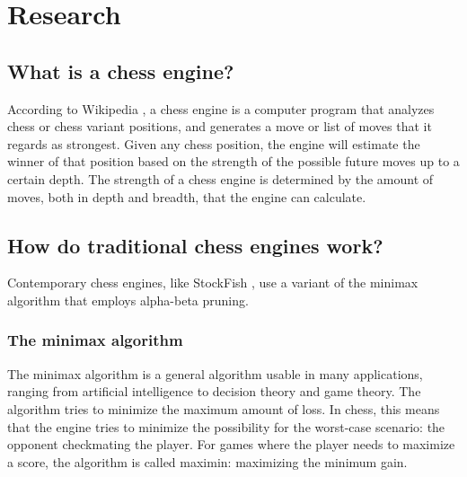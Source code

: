 \documentclass{article}
\begin{document}
\newpage
\section{Research}

% 
%
%

\subsection{What is a chess engine?}

According to Wikipedia \cite{ChessEngine2022}, a chess engine is a computer program that analyzes 
chess or chess variant positions, and generates a move or list of moves that it regards as strongest.
Given any chess position, the engine will estimate the winner of that position based on the strength 
of the possible future moves up to a certain depth. The strength of a chess engine is determined by
the amount of moves, both in depth and breadth, that the engine can calculate. 


\subsection{How do traditional chess engines work?}

Contemporary chess engines, like StockFish \cite{StockfishChess2022}, use a variant of the minimax algorithm that employs alpha-beta pruning.

\subsubsection{The minimax algorithm}

The minimax algorithm \cite{Minimax2022} is a general algorithm usable in many applications, ranging from artificial intelligence to 
decision theory and game theory. The algorithm tries to minimize the maximum amount of loss. In chess, this means 
that the engine tries to minimize the possibility for the worst-case scenario: the opponent
checkmating the player. For games where the player needs to maximize a score, the algorithm is called maximin: 
maximizing the minimum gain. 
\end{document}
